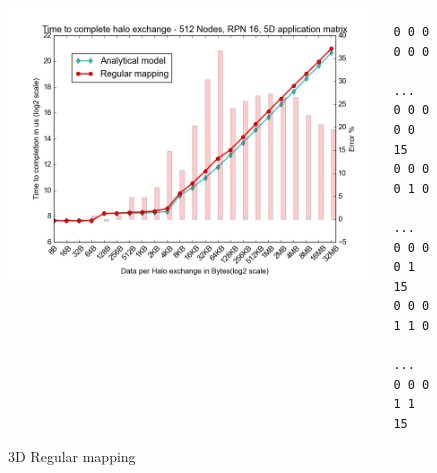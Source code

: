 \documentclass{beamer}
\begin{document}
\begin{frame}[fragile]
\begin{figure}
\caption{3D Regular mapping}
\begin{columns}
  \begin{column}{0.6\textwidth}
    \includegraphics[width=1\textwidth]{../mappings/3d_regular.png}
  \end{column}
  \begin{column}{0.3\textwidth}
\lstset{title=Mapping sample}
\begin{lstlisting}[basicstyle=\footnotesize\ttfamily, frame=lines,columns=fixed]
0 0 0 0 0 0
    ...
0 0 0 0 0 15
0 0 0 0 1 0
    ...
0 0 0 0 1 15
0 0 0 1 1 0
    ...
0 0 0 1 1 15
\end{lstlisting}
  \end{column}
\end{columns}
\end{figure}
\end{frame}
\end{document}
